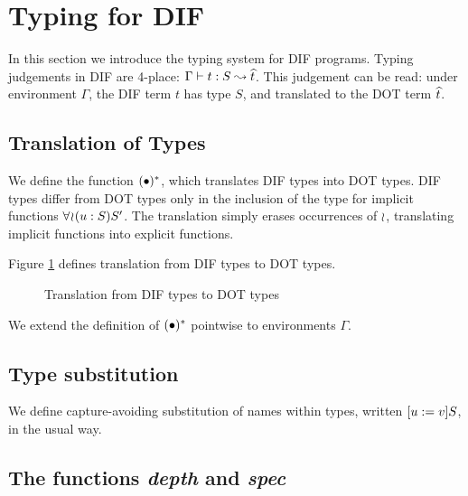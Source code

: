 \section{Typing for DIF}
\label{typing}

In this section we introduce the typing system for DIF programs. Typing
judgements in DIF are 4-place: $\Gamma \vdash t: S \leadsto \widehat{t}$. This judgement can
be read: under environment $\Gamma$, the DIF term $t$ has type $S$, and
translated to the DOT term $\widehat{t}$.

\subsection{Translation of Types}

We define the function $(\bullet)^{*}$, which translates DIF types into DOT types. DIF types differ from DOT types only in the inclusion of the type for implicit functions $\forall\!\wr\!(u:S)S'$. The translation simply erases occurrences of $\wr$, translating implicit functions into explicit functions.

\begin{DEFINITION}
    \label{translation}
    Figure \ref{figure_translation} defines translation from DIF types to DOT
    types.
\end{DEFINITION}

\begin{figure}[h]
    
    \caption{Translation from DIF types to DOT types}
    \label{figure_translation}
\end{figure}

We extend the definition of $(\bullet)^{*}$ pointwise to environments
$\Gamma$.

\subsection{Type substitution}

\begin{DEFINITION}
    \label{substitution}
    We define capture-avoiding substitution of names within types, written
    $[u := v]S$, in the usual way.
\end{DEFINITION}

\subsection{The functions \textit{depth} and \textit{spec}}

